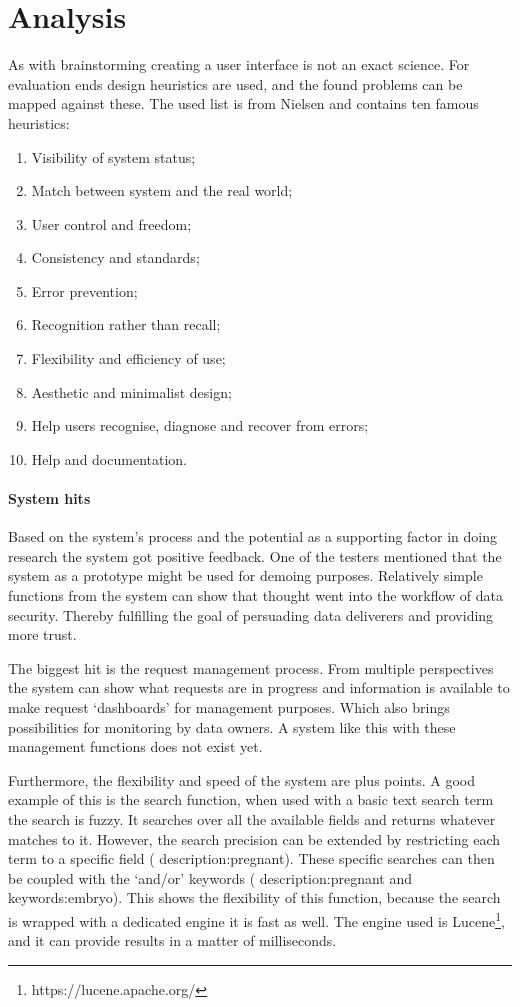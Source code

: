 \section{Analysis}

As with brainstorming creating a user interface is not an exact science.
For evaluation ends design heuristics are used, and the found problems can be mapped against these.
The used list is from Nielsen \cite{designHeuristics} and contains ten famous heuristics:

\begin{enumerate}
	\item Visibility of system status;
	\item Match between system and the real world;
	\item User control and freedom;
	\item Consistency and standards;
	\item Error prevention;
	\item Recognition rather than recall;
	\item Flexibility and efficiency of use;
	\item Aesthetic and minimalist design;
	\item Help users recognise, diagnose and recover from errors;
	\item Help and documentation.
\end{enumerate}

\paragraph{System hits}
Based on the system's process and the potential as a supporting factor in doing research the system got positive feedback.
One of the testers mentioned that the system as a prototype might be used for demoing purposes.
Relatively simple functions from the system can show that thought went into the workflow of data security.
Thereby fulfilling the goal of persuading data deliverers and providing more trust.

The biggest hit is the request management process.
From multiple perspectives the system can show what requests are in progress and information is available to make request `dashboards' for management purposes.
Which also brings possibilities for monitoring by data owners.
A system like this with these management functions does not exist yet.

Furthermore, the flexibility and speed of the system are plus points.
A good example of this is the search function, when used with a basic text search term the search is fuzzy.
It searches over all the available fields and returns whatever matches to it.
However, the search precision can be extended by restricting each term to a specific field (\eg{} description:pregnant).
These specific searches can then be coupled with the `and/or' keywords (\eg{} description:pregnant and keywords:embryo).
This shows the flexibility of this function, because the search is wrapped with a dedicated engine it is fast as well.
The engine used is Lucene\footnote{https://lucene.apache.org/}, and it can provide results in a matter of milliseconds.

